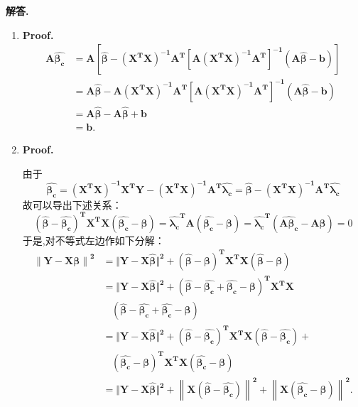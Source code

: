 \documentclass[12pt, a4paper, oneside]{ctexart}
\newenvironment{solution}{\par\noindent\textbf{解答. }}{\par}
\begin{document}
\begin{solution}
	
   	\begin{enumerate}
   	\item {\tt}    {\bf Proof.} 
   	  \begin{equation*}
     	\begin{split}
   	    \bm{A\hat{\beta _c} }  
   	    &=  \bm{A \left[ \hat{\beta} - \left(X^TX\right)^{-1}A^T \left[A \left(X^TX\right)^{-1}A^T\right]^{-1} \left( A\hat{\beta}-b\right)   \right]  }   \\
    	&= \bm{A  \hat{\beta} -A \left(X^TX\right)^{-1}A^T \left[A \left(X^TX\right)^{-1}A^T\right]^{-1} \left( A\hat{\beta}-b\right)     }   \\
    	&= \bm{A  \hat{\beta} - A\hat{\beta}+b     }  \\
    	&= \bm{b}.
   	    \end{split}
   	  \end{equation*}
   	
   	\item {\tt }   {\bf Proof.}
   	
   	
   	由于\[ \bm{\hat{\beta_c}=\left(X^TX\right)^{-1}X^TY-\left(X^TX\right)^{-1}A^T\hat{\lambda_c}= \hat{\beta} - \left(X^TX\right)^{-1}A^T\hat{\lambda_c}}  \]
   	故可以导出下述关系：
    \[\bm{\left(\hat{\beta}-\hat{\beta_c}\right)^TX^TX\left(\hat{\beta_c}-\beta\right)= \hat{\lambda_c}^TA\left(\hat{\beta_c}-\beta\right) =\hat{\lambda_c}^T\left(\hat{A\beta_c}-A\beta\right) = }0\]
   		于是,对不等式左边作如下分解：
   		 \begin{equation*}
   		\begin{split}
   	        \bm{\left\| Y-X\beta\right\|^2 }
   			&= \bm{\Vert Y-X \hat{\beta}\Vert^2 + \left( \hat{\beta} -\beta \right)^TX^TX \left( \hat{\beta} -\beta \right)}\\
   			&= \bm{\Vert Y-X \hat{\beta}\Vert^2 + \left( \hat{\beta} -\hat{\beta_c}+\hat{\beta_c} -\beta \right)^TX^TX }\\
   			& \ \ \ \ \bm{\left( \hat{\beta} -\hat{\beta_c}+\hat{\beta_c}-\beta \right)}\ \\
   			&=\bm{\Vert Y-X \hat{\beta}\Vert^2 + \left( \hat{\beta} -\hat{\beta_c}\right)^TX^TX\left( \hat{\beta} -\hat{\beta_c}\right)+} \\
   			&\ \ \ \  \bm{	\left( \hat{\beta_c} -\beta\right)^TX^TX\left( \hat{\beta_c} -\beta\right) }\\
   			&= \bm{\Vert Y-X \hat{\beta}\Vert^2 + \left\| X\left(\hat{\beta}-\hat{\beta_c}\right)\right\|^2+ \left\| X\left(\hat{\beta_c}-\beta\right)\right\|^2}.
   		\end{split}
   	\end{equation*}
    

\end{enumerate}
\end{solution}
\end{document}
